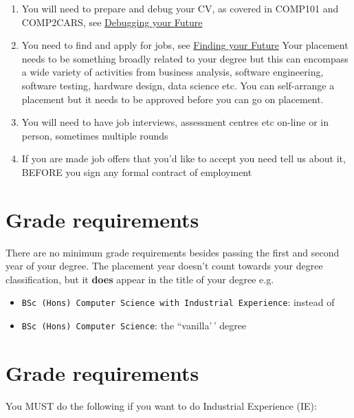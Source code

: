 \documentclass[
]{book}
\providecommand{\tightlist}{%
  \setlength{\itemsep}{0pt}\setlength{\parskip}{0pt}}
\begin{document}
\begin{enumerate}
\def\labelenumi{\arabic{enumi}.}
\tightlist
\item
  You will need to prepare and debug your CV, as covered in COMP101 and COMP2CARS, see \href{https://www.cdyf.me/debugging}{Debugging your Future} \citep{debugging}
\item
  You need to find and apply for jobs, see \href{https://www.cdyf.me/finding}{Finding your Future} \citep{finding} Your placement needs to be something broadly related to your degree but this can encompass a wide variety of activities from business analysis, software engineering, software testing, hardware design, data science etc. You can self-arrange a placement but it needs to be approved before you can go on placement.
\item
  You will need to have job interviews, assessment centres etc on-line or in person, sometimes multiple rounds
\item
  If you are made job offers that you'd like to accept you need tell us about it, BEFORE you sign any formal contract of employment
\end{enumerate}

\section{Grade requirements}\label{grade-requirements}

There are no minimum grade requirements besides passing the first and second year of your degree. The placement year doesn't count towards your degree classification, but it \textbf{does} appear in the title of your degree e.g.

\begin{itemize}
\tightlist
\item
  \texttt{BSc\ (Hons)\ Computer\ Science\ with\ Industrial\ Experience}: instead of
\item
  \texttt{BSc\ (Hons)\ Computer\ Science}: the ``vanilla'\,' degree
\end{itemize}

\section{Grade requirements}\label{grade-requirements-1}

You MUST do the following if you want to do Industrial Experience (IE):
\end{document}
